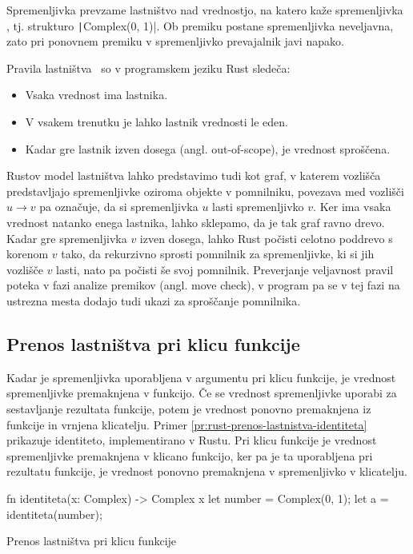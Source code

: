 Spremenljivka  prevzame lastništvo nad vrednostjo, na katero kaže spremenljivka , tj. strukturo \texttt|Complex(0, 1)|. Ob premiku postane spremenljivka  neveljavna, zato pri ponovnem premiku v spremenljivko  prevajalnik javi napako.

Pravila lastništva~\cite{klabnik2023rust} so v programskem jeziku Rust sledeča:

\begin{itemize}
	\itemsep 0em
	\item Vsaka vrednost ima lastnika.
	\item V vsakem trenutku je lahko lastnik vrednosti le eden.
	\item Kadar gre lastnik izven dosega (angl. out-of-scope), je vrednost spro\-šče\-na.
\end{itemize}

Rustov model lastništva lahko predstavimo tudi kot graf, v katerem vozlišča predstavljajo spremenljivke oziroma objekte v pomnilniku, povezava med vozlišči $u \to v$ pa označuje, da si spremenljivka $u$ lasti spremenljivko $v$. Ker ima vsaka vrednost natanko enega lastnika, lahko sklepamo, da je tak graf ravno drevo. Kadar gre spremenljivka $v$ izven dosega, lahko Rust počisti celotno poddrevo s korenom $v$ tako, da rekurzivno sprosti pomnilnik za spremenljivke, ki si jih vozlišče $v$ lasti, nato pa počisti še svoj pomnilnik. Preverjanje veljavnost pravil poteka v fazi analize premikov (angl. move check), v program pa se v tej fazi na ustrezna mesta dodajo tudi ukazi za sproščanje pomnilnika.

\subsection{Prenos lastništva pri klicu funkcije}

Kadar je spremenljivka uporabljena v argumentu pri klicu funkcije, je vrednost spremenljivke premaknjena v funkcijo. Če se vrednost spremenljivke uporabi za sestavljanje rezultata funkcije, potem je vrednost ponovno premaknjena iz funkcije in vrnjena klicatelju. Primer \ref{pr:rust-prenos-lastnistva-identiteta} prikazuje identiteto, implementirano v Rustu. Pri klicu funkcije je vrednost spremenljivke  premaknjena v klicano funkcijo, ker pa je ta uporabljena pri rezultatu funkcije, je vrednost ponovno premaknjena v spremenljivko  v klicatelju.

\begin{primer}[ht]
\centering
\begin{rust-success}
fn identiteta(x: Complex) -> Complex { x }
let number = Complex(0, 1);
let a = identiteta(number);
\end{rust-success}
\caption{Prenos lastništva pri klicu funkcije }
\label{pr:rust-prenos-lastnistva-identiteta}
\end{primer}

